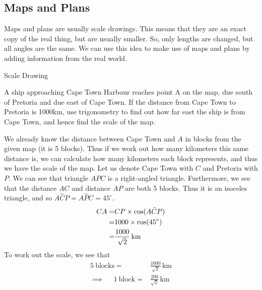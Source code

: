\documentclass[10pt,a4paper,titlepage,twoside,openright]{report}
\begin{document}
\subsection{Maps and Plans}
Maps and plans are usually scale drawings. This means that they are an exact copy of the real thing, but are usually smaller. So, only lengths are changed, but all angles are the same. We can use this idea to make use of maps and plans by adding information from the real world.

\begin{wex}{Scale Drawing}{A ship approaching Cape Town Harbour reaches point A on the map, due south of Pretoria and due east of Cape Town. If the distance from Cape Town to Pretoria is 1000km, use trigonometry to find out how far east the ship is from Cape Town, and hence find the scale of the map. 


}{
We already know the distance between Cape Town and $A$ in blocks from the given map (it is 5 blocks). Thus if we work out how many kilometers this same distance is, we can calculate how many kilometers each block represents, and thus we have the scale of the map.
Let us denote Cape Town with $C$ and Pretoria with $P$.
    We can see that triangle $APC$ is a right-angled triangle. Furthermore, we see that the distance $AC$ and distance $AP$ are both 5 blocks. Thus it is an isoceles triangle, and so $A\hat{C}P=A\hat{P}C= 45^\circ$.  
 \begin{eqnarray*}
 CA=& CP\times \cos(A\hat{C}P)\\
	=& 1000 \times \cos(45^\circ) \\
	=&\frac{1000}{\sqrt{2}} \, \rm{km}
 \end{eqnarray*}
To work out the scale, we see that 
\begin{eqnarray*}
5 \ \text{blocks}=& \frac{1000}{\sqrt{2}}\, \text{km} \\
\implies \ \ \ \ \ \ 1 \ \text{block}=&\frac{200}{\sqrt{2}}\, \text{km}
\end{eqnarray*}
}
\end{wex}
\end{document}
